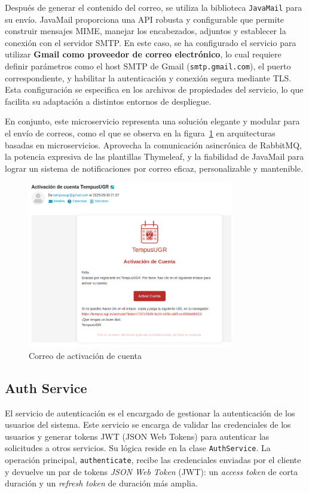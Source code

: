 Después de generar el contenido del correo, se utiliza la biblioteca \texttt{JavaMail} para su envío. JavaMail proporciona una API robusta y configurable que permite construir mensajes MIME, manejar los encabezados, adjuntos y establecer la conexión con el servidor SMTP. En este caso, se ha configurado el servicio para utilizar \textbf{Gmail como proveedor de correo electrónico}, lo cual requiere definir parámetros como el host SMTP de Gmail (\texttt{smtp.gmail.com}), el puerto correspondiente, y habilitar la autenticación y conexión segura mediante TLS. Esta configuración se especifica en los archivos de propiedades del servicio, lo que facilita su adaptación a distintos entornos de despliegue.

En conjunto, este microservicio representa una solución elegante y modular para el envío de correos, como el que se observa en la figura~\ref{fig:mail-service-class-diagram} en arquitecturas basadas en microservicios. Aprovecha la comunicación asincrónica de RabbitMQ, la potencia expresiva de las plantillas Thymeleaf, y la fiabilidad de JavaMail para lograr un sistema de notificaciones por correo eficaz, personalizable y mantenible.

\begin{figure}[H]
    \centering
    \includegraphics[width=0.8\textwidth]{figures/07_email.png}
    \caption{Correo de activación de cuenta}
    \label{fig:mail-service-class-diagram}
\end{figure}

\subsection{Auth Service}
El servicio de autenticación es el encargado de gestionar la autenticación de los usuarios del sistema. Este servicio se encarga de validar las credenciales de los usuarios y generar tokens JWT (JSON Web Tokens) para autenticar las solicitudes a otros servicios.
\newline\newline
Su lógica reside en la clase \texttt{AuthService}. 
La operación principal, \texttt{authenticate}, recibe las credenciales enviadas por el cliente y devuelve un par de tokens
\emph{JSON Web Token} (JWT): un \emph{access token} de corta duración y un \emph{refresh token} de duración más amplia. 

